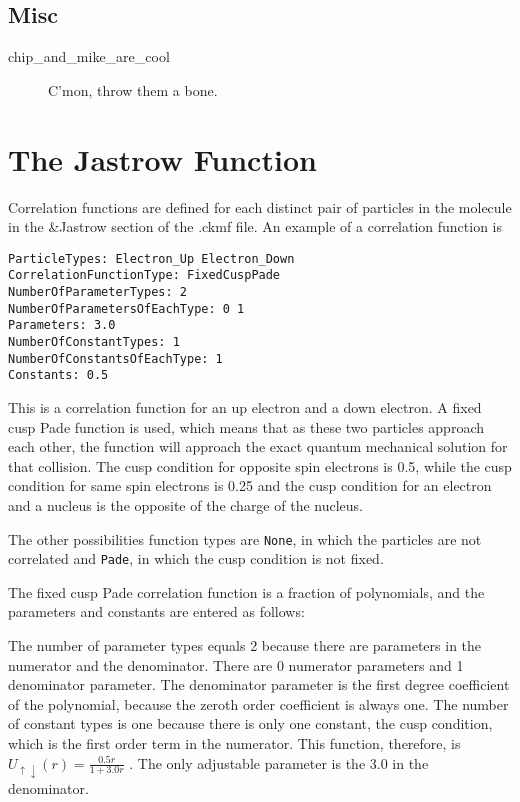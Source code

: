\documentclass[11pt]{article}
\begin{document}
\subsection{Misc}

\begin{description}

\item [chip\_and\_mike\_are\_cool] C'mon, throw them a bone.

\end{description}

\section{The Jastrow Function}

Correlation functions are defined for each distinct pair of particles in the
molecule in the \&Jastrow section of the .ckmf file.  An example of a
correlation function is

\begin{verbatim}
ParticleTypes: Electron_Up Electron_Down
CorrelationFunctionType: FixedCuspPade
NumberOfParameterTypes: 2
NumberOfParametersOfEachType: 0 1
Parameters: 3.0
NumberOfConstantTypes: 1
NumberOfConstantsOfEachType: 1
Constants: 0.5
\end{verbatim}

This is a correlation function for an up electron and a down
electron.  A fixed cusp Pade function is used, which means that as
these two particles approach each other, the function will approach
the exact quantum mechanical solution for that collision.  The cusp
condition for opposite spin electrons is 0.5, while the cusp condition
for same spin electrons is 0.25 and the cusp condition for an electron
and a nucleus is the opposite of the charge of the nucleus.

The other possibilities function types are \verb-None-, in which the
particles are not correlated and \verb-Pade-, in which the cusp condition
is not fixed.  

The fixed cusp Pade correlation function is a fraction of polynomials,
and the parameters and constants are entered as follows:

The number of parameter types equals 2 because there are parameters in
the numerator and the denominator.  There are 0 numerator parameters
and 1 denominator parameter.  The denominator parameter is the first
degree coefficient of the polynomial, because the zeroth order
coefficient is always one.  The number of constant types is one
because there is only one constant, the cusp condition, which is the
first order term in the numerator.  This function, therefore, is 
\(
U_{\uparrow \downarrow}(r)=\frac{0.5r}{1+3.0r}
\)
.  The only adjustable parameter is the 3.0 in the denominator. 
\end{document}
